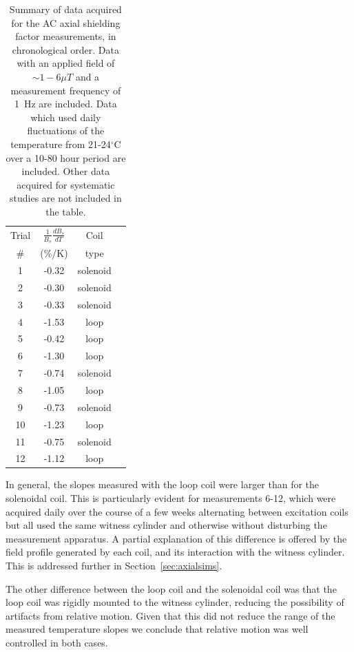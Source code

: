\begin{table}
\begin{center}
\begin{tabular}{cccc}\hline
Trial & $\frac{1}{B_s}\frac{dB_s}{dT}$ & Coil \\
\#    & (\%/K) & type \\\hline
 1 & -0.32 & solenoid \\
 2 & -0.30 & solenoid \\
 3 & -0.33 & solenoid \\
 4 & -1.53 & loop \\
 5 & -0.42 & loop \\
 6 & -1.30 & loop \\
 7 & -0.74 & solenoid \\
 8 & -1.05 & loop \\
 9 & -0.73 & solenoid \\
10 & -1.23 & loop \\
11 & -0.75 & solenoid \\
12 & -1.12 & loop \\\hline
\end{tabular}
\caption[Summary of the AC axial shielding factor
measurements]{Summary of data acquired for the AC axial shielding
  factor measurements, in chronological order.  Data with an applied
  field of $\sim 1-6\mu T$ and a measurement frequency of 1~Hz are
  included.  Data which used daily fluctuations of the temperature
  from 21-24$^\circ$C over a 10-80 hour period are included.  Other
  data acquired for systematic studies are not included in the
  table.\label{tab:axial}}
\end{center}
\end{table}

In general, the slopes measured with the loop coil were larger than
for the solenoidal coil.  This is particularly evident for
measurements 6-12, which were acquired daily over the course of a few
weeks alternating between excitation coils but all used the same
witness cylinder and otherwise without disturbing the measurement
apparatus.  A partial explanation of this difference is offered by the
field profile generated by each coil, and its interaction with the
witness cylinder.  This is addressed further in
Section~\ref{sec:axialsims}.

The other difference between the loop coil and the solenoidal coil was
that the loop coil was rigidly mounted to the witness cylinder,
reducing the possibility of artifacts from relative motion.  Given
that this did not reduce the range of the measured temperature slopes
we conclude that relative motion was well controlled in both cases.

